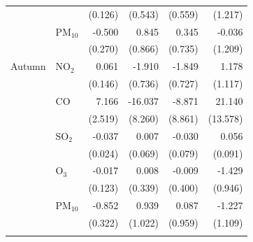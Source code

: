 \begin{tabular}{llrrrr}
 &  & (0.126) & (0.543) & (0.559) & (1.217) \\
 & PM$_{10}$ & -0.500 & 0.845 & 0.345 & -0.036 \\
 &  & (0.270) & (0.866) & (0.735) & (1.209) \\
\addlinespace[4pt]
Autumn & NO$_2$ & 0.061 & -1.910 & -1.849 & 1.178 \\
 &  & (0.146) & (0.736) & (0.727) & (1.117) \\
 & CO & 7.166 & -16.037 & -8.871 & 21.140 \\
 &  & (2.519) & (8.260) & (8.861) & (13.578) \\
 & SO$_2$ & -0.037 & 0.007 & -0.030 & 0.056 \\
 &  & (0.024) & (0.069) & (0.079) & (0.091) \\
 & O$_3$ & -0.017 & 0.008 & -0.009 & -1.429 \\
 &  & (0.123) & (0.339) & (0.400) & (0.946) \\
 & PM$_{10}$ & -0.852 & 0.939 & 0.087 & -1.227 \\
 &  & (0.322) & (1.022) & (0.959) & (1.109) \\
\addlinespace[4pt]
\bottomrule
\end{tabular}
